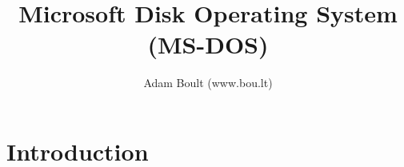 \documentclass[oneside]{book}
\begin{document}
\author{Adam Boult (www.bou.lt)}
\title{Microsoft Disk Operating System (MS-DOS)}
\maketitle

\setcounter{tocdepth}{0}
\tableofcontents



\part{Introduction}
\end{document}
